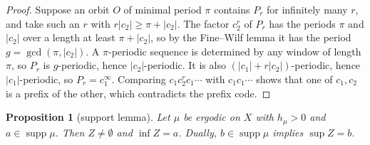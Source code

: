 \documentclass[11pt]{amsart}
\newtheorem{proposition}[theorem]{Proposition}
\theoremstyle{definition}
\theoremstyle{remark}
\begin{document}
\begin{proof}
Suppose an orbit $O$ of minimal period $\pi$ contains $P_r$ for infinitely many $r$, and take such an $r$ with $r|c_2|\ge\pi+|c_2|$. The factor $c_2^r$ of $P_r$ has the periods $\pi$ and $|c_2|$ over a length at least $\pi+|c_2|$, so by the Fine--Wilf lemma it has the period $g=\gcd(\pi,|c_2|)$. A $\pi$-periodic sequence is determined by any window of length $\pi$, so $P_r$ is $g$-periodic, hence $|c_2|$-periodic. It is also $(|c_1|+r|c_2|)$-periodic, hence $|c_1|$-periodic, so $P_r=c_1^\infty$. Comparing $c_1c_2^rc_1\cdots$ with $c_1c_1\cdots$ shows that one of $c_1,c_2$ is a prefix of the other, which contradicts the prefix code.
\end{proof}

\begin{proposition}[support lemma]\label{prop:S3}
Let $\mu$ be ergodic on $X$ with $h_\mu>0$ and $a\in\operatorname{supp}\mu$. Then $Z\ne\emptyset$ and $\inf Z=a$. Dually, $b\in\operatorname{supp}\mu$ implies $\sup Z=b$.
\end{proposition}
\end{document}
